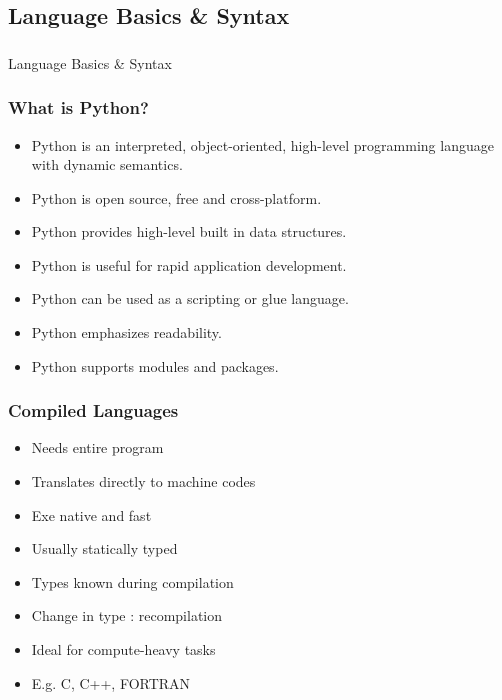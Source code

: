 \subsection{Language Basics \& Syntax}
\begin{frame}[fragile]\frametitle{}
\begin{center}
{\Large Language Basics \& Syntax}
\end{center}
\end{frame}

\begin{frame}[fragile]  \frametitle{What is Python?}
\begin{itemize}
\item Python is an interpreted, object-oriented, high-level programming language with dynamic semantics.
\item Python is open source, free and cross-platform.
\item Python provides high-level built in data structures.
\item Python is useful for rapid application development.
\item Python can be used as a scripting or glue language.
\item Python emphasizes readability.
\item Python supports modules and packages.
\end{itemize}
\end{frame}

\begin{frame}[fragile]  \frametitle{Compiled Languages}
\begin{itemize}
\item Needs entire program
\item Translates directly to machine codes
\item Exe native and fast
\item Usually statically typed
\item Types known during compilation
\item Change in type : recompilation
\item Ideal for compute-heavy tasks
\item E.g. C, C++, FORTRAN
\end{itemize}
\end{frame}

